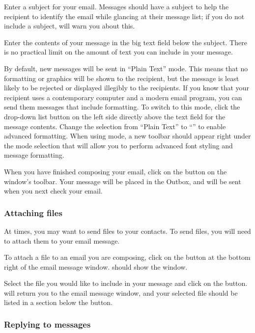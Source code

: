 Enter a subject for your email. Messages should have a subject to help the
recipient to identify the email while glancing at their message list;
if you do not include a subject,  will warn you about this.

Enter the contents of your message in the big text field below the subject.
There is no practical limit on the amount of text you can include in your
message.

By default, new messages will be sent in ``Plain Text'' mode. This means
that no formatting or graphics will be shown to the recipient, but the message
is least likely to be rejected or displayed illegibly to the recipients.
If you know that your recipient uses a contemporary computer and a modern
email program, you can send them messages that include formatting. To switch
to this mode, click the drop-down list button on the left side directly above 
the text field for the message contents. Change the selection from 
``Plain Text'' to ``'' to enable advanced formatting. When using  mode,
a new toolbar should appear right under the mode selection that will allow you
to perform advanced font styling and message formatting.

When you have finished composing your email, click on the  button 
on the window's toolbar. Your message will be placed in the Outbox, and will 
be sent when you next check your email.

\subsubsection{Attaching files}

At times, you may want to send files to your contacts. To send files, you 
will need to attach them to your email message.

To attach a file to an email you are composing, click on the  button at the bottom right of the email message window.  
should show the  window.

Select the file you would like to include in your message and click on the
 button.  will return you to the email message
window, and your selected file should be listed in a section below the 
 button.

\subsubsection{Replying to messages}

